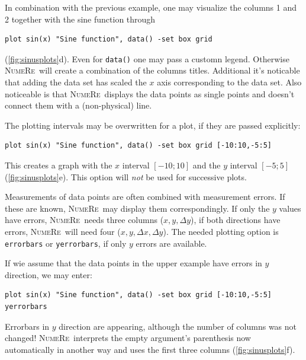 \documentclass[DIV=14,headsepline,footsepline]{scrbook}
\newcommand{\NR}{\textsc{Nu\-me\-Re}}
\begin{document}
				In combination with the previous example, one may visualize the columns 1 and 2 together with the sine function through
				\begin{lstlisting}
plot sin(x) "Sine function", data() -set box grid
				\end{lstlisting}
				(\autoref{fig:sinusplots}d). Even for \verb+data()+ one may pass a customn legend. Otherwise \NR\ will create a combination of the columns titles. Additional it's noticable that adding the data set has scaled the $x$ axis corresponding to the data set. Also noticeable is that \NR\ displays the data points as single points and doesn't connect them with a (non-physical) line.
				
				The plotting intervals may be overwritten for a plot, if they are passed explicitly:
				\begin{lstlisting}
plot sin(x) "Sine function", data() -set box grid [-10:10,-5:5]
				\end{lstlisting}
				This creates a graph with the $x$ interval $[-10;10]$ and the $y$ interval $[-5;5]$ (\autoref{fig:sinusplots}e). This option will \emph{not} be used for successive plots.
				
				Measurements of data points are often combined with measurement errors. If these are known, \NR\ may display them correspondingly. If only the $y$ values have errors, \NR\ needs three columns ($x,y,\Delta y$), if both directions have errors, \NR\ will need four ($x,y,\Delta x, \Delta y$). The needed plotting option is \verb+errorbars+ or \verb+yerrorbars+, if only $y$ errors are available.
				
				If wie assume that the data points in the upper example have errors in $y$ direction, we may enter:
				\begin{lstlisting}
plot sin(x) "Sine function", data() -set box grid [-10:10,-5:5] yerrorbars
				\end{lstlisting}
				Errorbars in $y$ direction are appearing, although the number of columns was not changed! \NR\ interprets the empty argument's parenthesis now automatically in another way and uses the first three columns (\autoref{fig:sinusplots}f).
				
\end{document}
